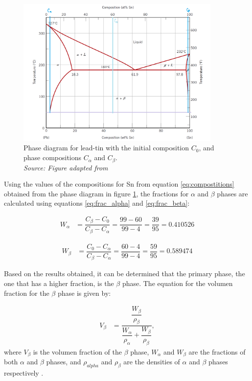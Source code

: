 \begin{figure}[h]
    \centering
    \includegraphics[width=0.9\textwidth]{graficas/diagrama.png}
    \caption{Phase diagram for lead-tin with the initial composition $C_0$, and phase compositions $C_{\alpha}$ and $C_{\beta}$.\\
    \textit{Source: Figure adapted from \citet[p.~300]{callister2010materials}}}
    \label{fig:diagrama}
\end{figure}

Using the values of the compositions for Sn from equation \ref{eq:compostitions} obtained from the phase diagram in figure \ref{fig:diagrama}, the fractions for $\alpha$ and $\beta$ phases are calculated using equations \eqref{eq:frac_alpha} and \eqref{eq:frac_beta}:

\begin{align}
    \label{eq:w_alpha}
    W_{\alpha}&=\dfrac{C_{\beta}-C_0}{C_{\beta}-C_{\alpha}} =\dfrac{99-60}{99-4} = \dfrac{39}{95} = 0.410526
\end{align}

\begin{align}
    \label{eq:w_beta}
    W_{\beta}&=\dfrac{C_0-C_{\alpha}}{C_{\beta}-C_{\alpha}} =\dfrac{60-4}{99-4} =\dfrac{59}{95} =0.589474
\end{align}

Based on the results obtained, it can be determined that the primary phase, the one that has a higher fraction, is the $\beta$ phase. The equation for the volumen fraction for the $\beta$ phase is given by:

\begin{align}
    \label{eq:vol_beta}
    V_{\beta}&=\dfrac{\dfrac{W_{\beta}}{\rho_{\beta}}}{\dfrac{W_{\alpha}}{\rho_{\alpha}}+\dfrac{W_{\beta}}{\rho_{\beta}}},
\end{align}
where $V_{\beta}$ is the volumen fraction of the $\beta$ phase, $W_{\alpha}$ and $W_{\beta}$ are the fractions of both $\alpha$ and $\beta$ phases, and $\rho_{alpha}$ and $\rho_{\beta}$ are the densities of $\alpha$ and $\beta$ phases respectively \citep[p.~293]{callister2010materials}.

